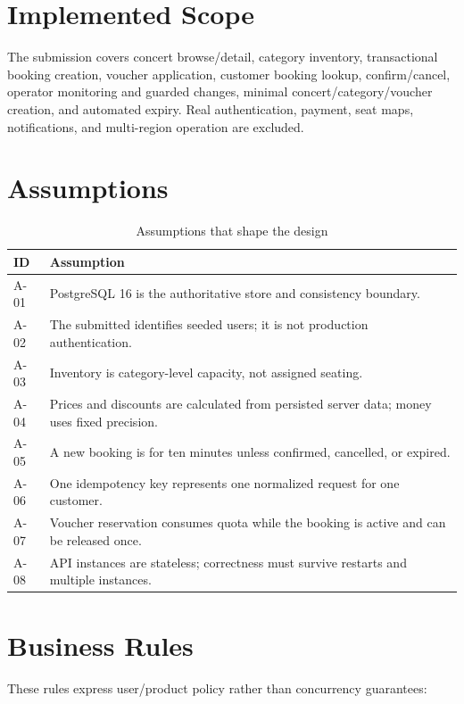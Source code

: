 \section{Implemented Scope}
The submission covers concert browse/detail, category inventory, transactional
booking creation, voucher application, customer booking lookup, confirm/cancel,
operator monitoring and guarded changes, minimal concert/category/voucher
creation, and automated expiry. Real authentication, payment, seat maps,
notifications, and multi-region operation are excluded.

\section{Assumptions}
\begin{table}[H]
\centering
\small
\caption{Assumptions that shape the design}
\begin{tabularx}{\textwidth}{p{}Y}
\toprule
\textbf{ID} & \textbf{Assumption} \\
\midrule
A-01 & PostgreSQL 16 is the authoritative store and consistency boundary. \\
A-02 & The submitted  identifies seeded users; it is not production authentication. \\
A-03 & Inventory is category-level capacity, not assigned seating. \\
A-04 & Prices and discounts are calculated from persisted server data; money uses fixed precision. \\
A-05 & A new booking is  for ten minutes unless confirmed, cancelled, or expired. \\
A-06 & One idempotency key represents one normalized request for one customer. \\
A-07 & Voucher reservation consumes quota while the booking is active and can be released once. \\
A-08 & API instances are stateless; correctness must survive restarts and multiple instances. \\
\bottomrule
\end{tabularx}
\end{table}

\section{Business Rules}
These rules express user/product policy rather than concurrency guarantees:

